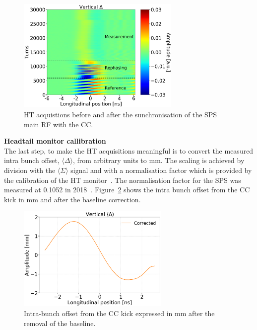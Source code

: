 \begin{figure}[!h]
   \centering         
   \includegraphics[width=0.7\textwidth]{images/Ch4/HT_2D__20180530_135105_before_after_sunchronisation_new_version.png}
       \caption{HT acquistions before and after the sunchronisation of the SPS main RF with the CC.}
       \label{fig:HT_baseline_correction_measurements_2D}
\end{figure}


\normalsize{\textbf{Headtail monitor callibration}}\\
The last step, to make the HT acquisitions meaningful is to convert the measured intra bunch offset, $\langle \Delta \rangle$, from arbitrary units to mm. The scaling is achieved by division with the $\langle \Sigma \rangle$ signal and with a normalisation factor which is provided by the calibration of the HT monitor~\cite{PhysRevAccelBeams.22.112803}. The normalisation factor for the SPS was measured at 0.1052 in 2018~\cite{HT_calibration_2018}. Figure~\ref{fig:HT_baseline_correction_crabbing_mm} shows the intra bunch offset from the CC kick in mm and after the baseline correction. 


\begin{figure}[!h]
   \centering         
   \includegraphics[width=0.65\textwidth]{images/Ch4/HT_corrected__20180530_135105_baseline_correction_new_version.png}
       \caption{Intra-bunch offset from the CC kick expressed in mm after the removal of the baseline.}
       \label{fig:HT_baseline_correction_crabbing_mm}
\end{figure}




